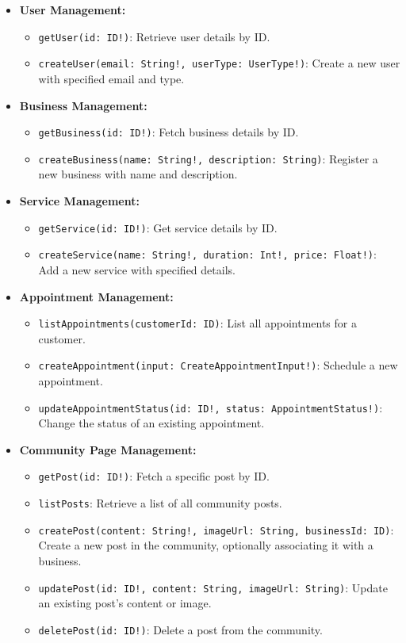 \begin{itemize}[leftmargin=*]
    \item \textbf{User Management:}
    \begin{itemize}
        \item \texttt{getUser(id: ID!)}: Retrieve user details by ID.
        \item \texttt{createUser(email: String!, userType: UserType!)}: Create a new user with specified email and type.
    \end{itemize}
    
    \item \textbf{Business Management:}
    \begin{itemize}
        \item \texttt{getBusiness(id: ID!)}: Fetch business details by ID.
        \item \texttt{createBusiness(name: String!, description: String)}: Register a new business with name and description.
    \end{itemize}
    
    \item \textbf{Service Management:}
    \begin{itemize}
        \item \texttt{getService(id: ID!)}: Get service details by ID.
        \item \texttt{createService(name: String!, duration: Int!, price: Float!)}: Add a new service with specified details.
    \end{itemize}

    \item \textbf{Appointment Management:}
    \begin{itemize}
        \item \texttt{listAppointments(customerId: ID)}: List all appointments for a customer.
        \item \texttt{createAppointment(input: CreateAppointmentInput!)}: Schedule a new appointment.
        \item \texttt{updateAppointmentStatus(id: ID!, status: AppointmentStatus!)}: Change the status of an existing appointment.
    \end{itemize}

    \item \textbf{Community Page Management:}
    \begin{itemize}
        \item \texttt{getPost(id: ID!)}: Fetch a specific post by ID.
        \item \texttt{listPosts}: Retrieve a list of all community posts.
        \item \texttt{createPost(content: String!, imageUrl: String, businessId: ID)}: Create a new post in the community, optionally associating it with a business.
        \item \texttt{updatePost(id: ID!, content: String, imageUrl: String)}: Update an existing post's content or image.
        \item \texttt{deletePost(id: ID!)}: Delete a post from the community.


\end{itemize}
\end{itemize}
